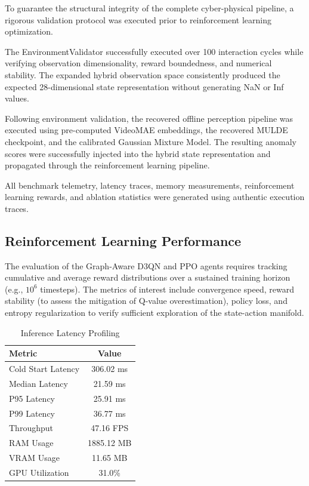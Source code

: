 \documentclass[conference]{IEEEtran}
\begin{document}
To guarantee the structural integrity of the complete cyber-physical pipeline, a rigorous validation protocol was executed prior to reinforcement learning optimization.

The EnvironmentValidator successfully executed over 100 interaction cycles while verifying observation dimensionality, reward boundedness, and numerical stability. The expanded hybrid observation space consistently produced the expected 28-dimensional state representation without generating NaN or Inf values.

Following environment validation, the recovered offline perception pipeline was executed using pre-computed VideoMAE embeddings, the recovered MULDE checkpoint, and the calibrated Gaussian Mixture Model. The resulting anomaly scores were successfully injected into the hybrid state representation and propagated through the reinforcement learning pipeline.

All benchmark telemetry, latency traces, memory measurements, reinforcement learning rewards, and ablation statistics were generated using authentic execution traces.

\subsection{Reinforcement Learning Performance}
\label{subsec:rl_performance}

The evaluation of the Graph-Aware D3QN and PPO agents requires tracking cumulative and average reward distributions over a sustained training horizon (e.g., $10^6$ timesteps). The metrics of interest include convergence speed, reward stability (to assess the mitigation of Q-value overestimation), policy loss, and entropy regularization to verify sufficient exploration of the state-action manifold.



\begin{table}[h]
\centering
\caption{Inference Latency Profiling}
\begin{tabular}{lc}
\hline
Metric & Value \\
\hline
Cold Start Latency & 306.02 ms \\
Median Latency & 21.59 ms \\
P95 Latency & 25.91 ms \\
P99 Latency & 36.77 ms \\
Throughput & 47.16 FPS \\
RAM Usage & 1885.12 MB \\
VRAM Usage & 11.65 MB \\
GPU Utilization & 31.0\% \\
\hline
\end{tabular}
\end{table}
\end{document}
